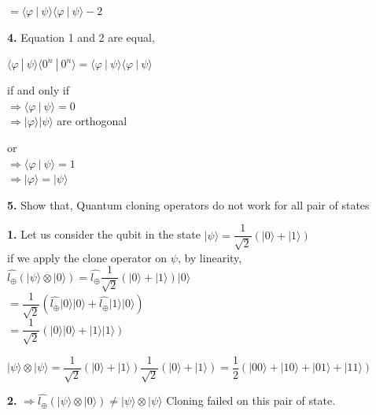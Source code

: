 \documentclass [12pt]{article}
\theoremstyle{definition}
\newcommand{\ket}[1]{| {#1} \rangle}
\newcommand{\braket}[2]{\langle #1 \ | \ #2 \rangle}
\begin{document}
\phantom{1000em} $= \braket{\varphi}{\psi}\braket{\varphi}{\psi} - 2$

\phantom{1em} {\bf 4.} Equation 1 and 2 are equal,

\phantom{1000em} $\braket{\varphi}{\psi}\braket{0^{n}}{0^{n}} = \braket{\varphi}{\psi}\braket{\varphi}{\psi}$

\phantom{1000em} if and only if\\
\phantom{1000em} $\Rightarrow \braket{\varphi}{\psi} = 0 $\\
\phantom{1000em} $\Rightarrow \ket{\varphi} \ket{\psi}$ are orthogonal  

\phantom{1000em} or\\
\phantom{1000em} $\Rightarrow \braket{\varphi}{\psi} = 1$\\
\phantom{1000em} $\Rightarrow \ket{\varphi} = \ket{\psi}$

{\bf 5.} Show that, Quantum cloning operators do not work for all pair of states

\phantom{1em} {\bf 1.} Let us consider the qubit in the state $\ket{\psi} = \dfrac{1}{\sqrt{2}}(\ket{0} + \ket{1})$ \\
\phantom{1000em} if we apply the clone operator on $\psi$, by linearity, \\
\phantom{1000em} $\hat{l_{\oplus}}(\ket{\psi} \otimes \ket{0}) = \hat{l_{\oplus}}\dfrac{1}{\sqrt{2}}(\ket{0} + \ket{1})\ket{0}$ \\
\phantom{1000em} $ = \dfrac{1}{\sqrt{2}}(\hat{l_{\oplus}}\ket{0}\ket{0} + \hat{l_{\oplus}}\ket{1}\ket{0})$\\
\phantom{1000em} $ = \dfrac{1}{\sqrt{2}}(\ket{0}\ket{0} +\ket{1}\ket{1})$

\phantom{1000em} $ \ket{\psi} \otimes \ket{\psi} = \dfrac{1}{\sqrt{2}}(\ket{0} + \ket{1})\dfrac{1}{\sqrt{2}}(\ket{0} + \ket{1}) = \dfrac{1}{2}(\ket{00} + \ket{10} + \ket{01} + \ket{11})$

\phantom{1em} {\bf 2.} $\Rightarrow \hat{l_{\oplus}}(\ket{\psi} \otimes \ket{0}) \neq \ket{\psi} \otimes \ket{\psi}$ Cloning failed on this pair of state.
\end{document}
